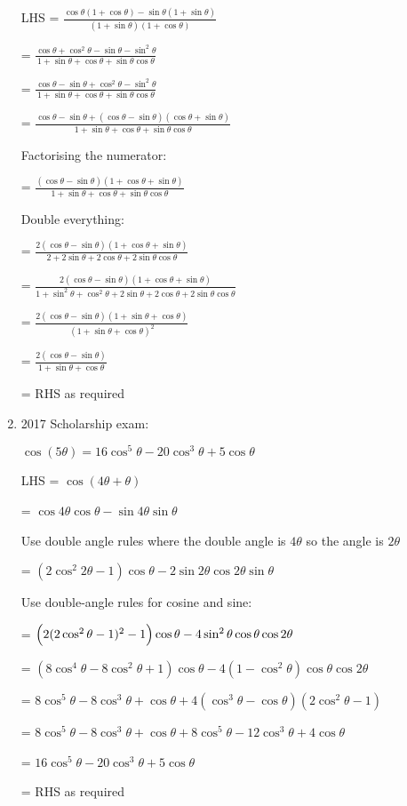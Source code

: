 \documentclass[../main.tex]{subfiles}
\begin{document}
\begin{enumerate}
    LHS = $\frac{\cos{\theta}(1+\cos{\theta})-\sin{\theta}(1+\sin{\theta})}{(1+\sin{\theta})(1+\cos{\theta})}$

    = $\frac{\cos{\theta}+\cos^2{\theta}-\sin{\theta}-\sin^2{\theta}}{1+\sin{\theta}+\cos{\theta}+\sin{\theta}\cos{\theta}}$

    = $\frac{\cos{\theta}-\sin{\theta}+\cos^2{\theta}-\sin^2{\theta}}{1+\sin{\theta}+\cos{\theta}+\sin{\theta}\cos{\theta}}$

    = $\frac{\cos{\theta}-\sin{\theta}+(\cos{\theta}-\sin{\theta})(\cos{\theta}+\sin{\theta})}{1+\sin{\theta}+\cos{\theta}+\sin{\theta}\cos{\theta}}$

    Factorising the numerator:

    = $\frac{(\cos{\theta}-\sin{\theta})(1+\cos{\theta}+\sin{\theta})}{1+\sin{\theta}+\cos{\theta}+\sin{\theta}\cos{\theta}}$ 

    Double everything:

    = $\frac{2(\cos{\theta}-\sin{\theta})(1+\cos{\theta}+\sin{\theta})}{2+2\sin{\theta}+2\cos{\theta}+2\sin{\theta}\cos{\theta}}$

    = $\frac{2(\cos{\theta}-\sin{\theta})(1+\cos{\theta}+\sin{\theta})}{1+\sin^2{\theta}+\cos^2{\theta}+2\sin{\theta}+2\cos{\theta}+2\sin{\theta}\cos{\theta}}$

    = $\frac{2(\cos{\theta}-\sin{\theta})(1+\sin{\theta}+\cos{\theta})}{(1+\sin{\theta}+\cos{\theta})^2}$

    = $\frac{2(\cos{\theta}-\sin{\theta})}{1+\sin{\theta}+\cos{\theta}}$

    = RHS as required

    \item 2017 Scholarship exam:
    
    $\cos{(5\theta)}=16\cos^5{\theta}-20\cos^3{\theta}+5\cos{\theta}$

    LHS = $\cos{(4\theta + \theta)}$

    = $\cos{4\theta}\cos{\theta}-\sin{4\theta}\sin{\theta}$

    Use double angle rules where the double angle is $4\theta$ so the angle is $2\theta$

    = $(2\cos^2{2\theta}-1)\cos{\theta}-2\sin{2\theta}\cos{2\theta}\sin{\theta}$

    Use double-angle rules for cosine and sine:

    = $\Bigl(2(2\cos^2{\theta}-1)^2 -1\Bigr)\cos{\theta}-4\sin^2{\theta}\cos{\theta}\cos{2\theta}$

    = $(8\cos^4{\theta}-8\cos^2{\theta}+1)\cos{\theta}-4(1-\cos^2{\theta})\cos{\theta}\cos{2\theta}$

    = $8\cos^5{\theta}-8\cos^3{\theta}+\cos{\theta}+4(\cos^3{\theta}-\cos{\theta})(2\cos^2{\theta}-1)$

    = $8\cos^5{\theta}-8\cos^3{\theta}+\cos{\theta}+8\cos^5{\theta}-12\cos^3{\theta}+4\cos{\theta}$

    = $16\cos^5{\theta}-20\cos^3{\theta}+5\cos{\theta}$

    = RHS as required

    
\end{enumerate}
\end{document}
